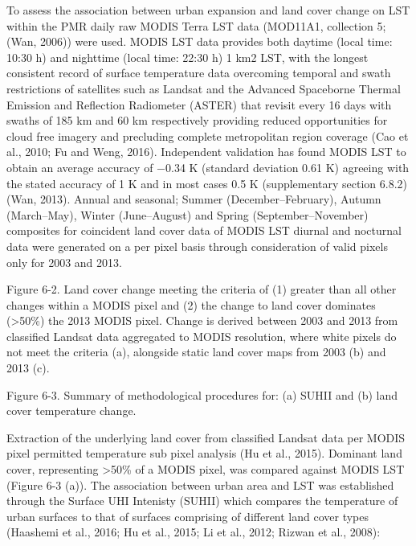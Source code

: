 \documentclass[]{book}
\begin{document}
To assess the association between urban expansion and land cover change
on LST within the PMR daily raw MODIS Terra LST data (MOD11A1,
collection 5; (Wan, 2006)) were used. MODIS LST data provides both
daytime (local time: 10:30 h) and nighttime (local time: 22:30 h) 1 km2
LST, with the longest consistent record of surface temperature data
overcoming temporal and swath restrictions of satellites such as Landsat
and the Advanced Spaceborne Thermal Emission and Reflection Radiometer
(ASTER) that revisit every 16 days with swaths of 185 km and 60 km
respectively providing reduced opportunities for cloud free imagery and
precluding complete metropolitan region coverage (Cao et al., 2010; Fu
and Weng, 2016). Independent validation has found MODIS LST to obtain an
average accuracy of −0.34 K (standard deviation 0.61 K) agreeing with
the stated accuracy of 1 K and in most cases 0.5 K (supplementary
section 6.8.2) (Wan, 2013). Annual and seasonal; Summer
(December--February), Autumn (March--May), Winter (June--August) and
Spring (September--November) composites for coincident land cover data
of MODIS LST diurnal and nocturnal data were generated on a per pixel
basis through consideration of valid pixels only for 2003 and 2013.

Figure 6-2. Land cover change meeting the criteria of (1) greater than
all other changes within a MODIS pixel and (2) the change to land cover
dominates (\textgreater{}50\%) the 2013 MODIS pixel. Change is derived
between 2003 and 2013 from classified Landsat data aggregated to MODIS
resolution, where white pixels do not meet the criteria (a), alongside
static land cover maps from 2003 (b) and 2013 (c).

Figure 6-3. Summary of methodological procedures for: (a) SUHII and (b)
land cover temperature change.

Extraction of the underlying land cover from classified Landsat data per
MODIS pixel permitted temperature sub pixel analysis (Hu et al., 2015).
Dominant land cover, representing \textgreater{}50\% of a MODIS pixel,
was compared against MODIS LST (Figure 6-3 (a)). The association between
urban area and LST was established through the Surface UHI Intenisty
(SUHII) which compares the temperature of urban surfaces to that of
surfaces comprising of different land cover types (Haashemi et al.,
2016; Hu et al., 2015; Li et al., 2012; Rizwan et al., 2008):
\end{document}
